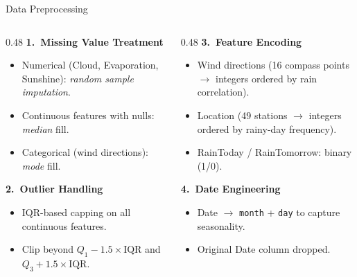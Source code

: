 \documentclass[aspectratio=169]{beamer}
\begin{document}
\begin{frame}{Data Preprocessing}
  \small
  \begin{columns}[T]
    \begin{column}{0.48\textwidth}
      \textbf{1.\ Missing Value Treatment}
      \begin{itemize}\setlength\itemsep{2pt}
        \item Numerical (Cloud, Evaporation, Sunshine): \emph{random sample imputation}.
        \item Continuous features with nulls: \emph{median} fill.
        \item Categorical (wind directions): \emph{mode} fill.
      \end{itemize}
      \vspace{0.4em}
      \textbf{2.\ Outlier Handling}
      \begin{itemize}\setlength\itemsep{2pt}
        \item IQR-based capping on all continuous features.
        \item Clip beyond $Q_1 - 1.5\!\times\!\text{IQR}$ and $Q_3 + 1.5\!\times\!\text{IQR}$.
      \end{itemize}
    \end{column}
    \begin{column}{0.48\textwidth}
      \textbf{3.\ Feature Encoding}
      \begin{itemize}\setlength\itemsep{2pt}
        \item Wind directions (16 compass points $\rightarrow$ integers ordered by rain correlation).
        \item Location (49 stations $\rightarrow$ integers ordered by rainy-day frequency).
        \item RainToday / RainTomorrow: binary (1/0).
      \end{itemize}
      \vspace{0.4em}
      \textbf{4.\ Date Engineering}
      \begin{itemize}\setlength\itemsep{2pt}
        \item Date $\rightarrow$ \texttt{month} + \texttt{day} to capture seasonality.
        \item Original Date column dropped.
      \end{itemize}
    \end{column}
  \end{columns}
\end{frame}
\end{document}
